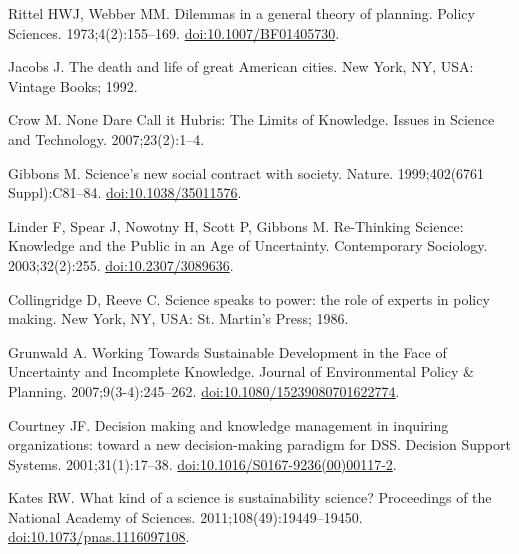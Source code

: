 \documentclass[10pt,a4paper]{article}
\renewcommand*{\refname}{References and Notes}
\begin{document}
\begin{multicols}{2}
\renewcommand*{\refname}{\normalsize{References and Notes}}

\begin{footnotesize}
%
%
\begin{thebibliography}{100}

Rittel HWJ, Webber MM.
\newblock Dilemmas in a general theory of planning.
\newblock Policy Sciences. 1973;4(2):155--169.
\newblock \href{https://doi.org/10.1007/BF01405730}{doi:10.1007/BF01405730}.

Jacobs J.
\newblock The death and life of great {American} cities.
\newblock New York, NY, USA: Vintage Books; 1992.

Crow M.
\newblock None {Dare} {Call} it {Hubris}: {The} {Limits} of {Knowledge}.
\newblock Issues in Science and Technology. 2007;23(2):1--4.

Gibbons M.
\newblock Science's new social contract with society.
\newblock Nature. 1999;402(6761 Suppl):C81--84.
\newblock \href{https://doi.org/10.1038/35011576}{doi:10.1038/35011576}.

Linder F, Spear J, Nowotny H, Scott P, Gibbons M.
\newblock Re-{Thinking} {Science}: {Knowledge} and the {Public} in an {Age} of
  {Uncertainty}.
\newblock Contemporary Sociology. 2003;32(2):255.
\newblock \href{https://doi.org/10.2307/3089636}{doi:10.2307/3089636}.

Collingridge D, Reeve C.
\newblock Science speaks to power: the role of experts in policy making.
\newblock New York, NY, USA: St. Martin's Press; 1986.

Grunwald A.
\newblock Working {Towards} {Sustainable} {Development} in the {Face} of
  {Uncertainty} and {Incomplete} {Knowledge}.
\newblock Journal of Environmental Policy \& Planning. 2007;9(3-4):245--262.
\newblock
  \href{https://doi.org/10.1080/15239080701622774}{doi:10.1080/15239080701622774}.

Courtney JF.
\newblock Decision making and knowledge management in inquiring organizations:
  toward a new decision-making paradigm for {DSS}.
\newblock Decision Support Systems. 2001;31(1):17--38.
\newblock
  \href{https://doi.org/10.1016/S0167-9236(00)00117-2}{doi:10.1016/S0167-9236(00)00117-2}.

Kates RW.
\newblock What kind of a science is sustainability science?
\newblock Proceedings of the National Academy of Sciences.
  2011;108(49):19449--19450.
\newblock
  \href{https://doi.org/10.1073/pnas.1116097108}{doi:10.1073/pnas.1116097108}.


\end{thebibliography}
\end{footnotesize}
\end{multicols}
\end{document}
